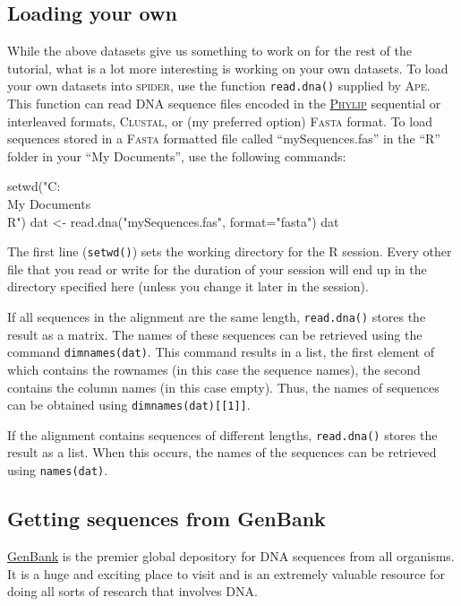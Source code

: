 \documentclass{article}
\newcommand{\spider}{\textsc{spider}} %
\newcommand{\progname}[1]{\textsc{#1}}
\newcommand{\fun}[1]{\texttt{#1}}
\begin{document}
\subsection{Loading your own}
While the above datasets give us something to work on for the rest of the tutorial, what is a lot more interesting is working on your own datasets. To load your own datasets into \spider, use the function \fun{read.dna()} supplied by \progname{Ape}. This function can read DNA sequence files encoded in the \href{http://cmgm.stanford.edu/phylip/formats.html#6}{\progname{Phylip}} sequential or interleaved formats, \progname{Clustal}, or (my preferred option) \progname{Fasta} format. To load sequences stored in a \progname{Fasta} formatted file called ``mySequences.fas'' in the ``R'' folder in your ``My Documents'', use the following commands:

\begin{console}
setwd("C:\\My Documents\\R")
dat <- read.dna("mySequences.fas", format="fasta")
dat
\end{console}

The first line (\fun{setwd()}) sets the working directory for the \progname{R} session. Every other file that you read or write for the duration of your session will end up in the directory specified here (unless you change it later in the session).

If all sequences in the alignment are the same length, \fun{read.dna()} stores the result as a matrix. The names of these sequences can be retrieved using the command \fun{dimnames(dat)}. This command results in a list, the first element of which contains the rownames (in this case the sequence names), the second contains the column names (in this case empty). Thus, the names of sequences can be obtained using \fun{dimnames(dat)[[1]]}.

If the alignment contains sequences of different lengths, \fun{read.dna()} stores the result as a list. When this occurs, the names of the sequences can be retrieved using \fun{names(dat)}. 

\subsection{Getting sequences from GenBank}
\href{http://www.ncbi.nlm.nih.gov/nuccore}{GenBank} is the premier global depository for DNA sequences from all organisms. It is a huge and exciting place to visit and is an extremely valuable resource for doing all sorts of research that involves DNA. 
\end{document}
